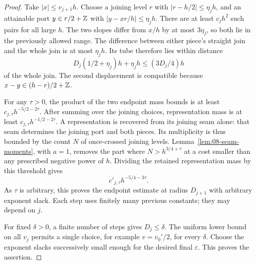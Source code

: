 \begin{proof}
Take $|x|\le v_{j+1}h$. Choose a joining level $r$ with $|r-h/2|\le\eta_jh$, and an attainable port $y\in r/2+\mathbb Z$ with $|y-xr/h|\le\eta_jh$. There are at least $c_jh^2$ such pairs for all large $h$. The two slopes differ from $x/h$ by at most $3\eta_j$, so both lie in the previously allowed range. The difference between either piece's straight join and the whole join is at most $\eta_jh$. Its tube therefore lies within distance
\[
 D_j(1/2+\eta_j)h+\eta_jh\le(3D_j/4)h
\]
of the whole join. The second displacement is compatible because $x-y\in(h-r)/2+\mathbb Z$.

For any $\tau>0$, the product of the two endpoint mass bounds is at least $c_{j,\tau}h^{-5/2-2\tau}$. After summing over the joining choices, representation mass is at least $c_{j,\tau}h^{-1/2-2\tau}$. A representation is recovered from its joining seam alone: that seam determines the joining port and both pieces. Its multiplicity is thus bounded by the count $N$ of once-crossed joining levels. Lemma~\ref{lem:08-seam-moments}, with $a=1$, removes the part where $N>h^{3/4+\tau}$ at a cost smaller than any prescribed negative power of $h$. Dividing the retained representation mass by this threshold gives
\[
 c'_{j,\tau}h^{-5/4-3\tau}.
\]
As $\tau$ is arbitrary, this proves the endpoint estimate at radius $D_{j+1}$ with arbitrary exponent slack. Each step uses finitely many previous constants; they may depend on $j$.

For fixed $\delta>0$, a finite number of steps gives $D_j\le\delta$. The uniform lower bound on all $v_j$ permits a single choice, for example $v=v_0'/2$, for every $\delta$. Choose the exponent slacks successively small enough for the desired final $\varepsilon$. This proves the assertion.
\end{proof}

